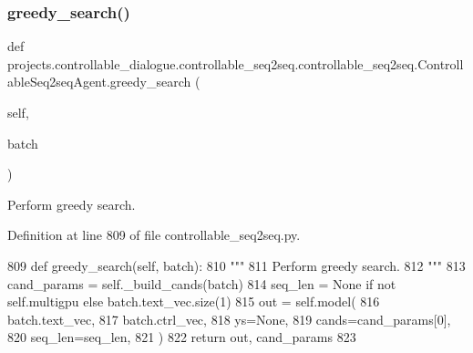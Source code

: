 \subsubsection{\texorpdfstring{greedy\+\_\+search()}{greedy\_search()}}
{\footnotesize\ttfamily def projects.\+controllable\+\_\+dialogue.\+controllable\+\_\+seq2seq.\+controllable\+\_\+seq2seq.\+Controllable\+Seq2seq\+Agent.\+greedy\+\_\+search (\begin{DoxyParamCaption}\item[{}]{self,  }\item[{}]{batch }\end{DoxyParamCaption})}

\begin{DoxyVerb}Perform greedy search.
\end{DoxyVerb}
 

Definition at line 809 of file controllable\+\_\+seq2seq.\+py.


\begin{DoxyCode}
809     \textcolor{keyword}{def }greedy\_search(self, batch):
810         \textcolor{stringliteral}{"""}
811 \textcolor{stringliteral}{        Perform greedy search.}
812 \textcolor{stringliteral}{        """}
813         cand\_params = self.\_build\_cands(batch)
814         seq\_len = \textcolor{keywordtype}{None} \textcolor{keywordflow}{if} \textcolor{keywordflow}{not} self.multigpu \textcolor{keywordflow}{else} batch.text\_vec.size(1)
815         out = self.model(
816             batch.text\_vec,
817             batch.ctrl\_vec,
818             ys=\textcolor{keywordtype}{None},
819             cands=cand\_params[0],
820             seq\_len=seq\_len,
821         )
822         \textcolor{keywordflow}{return} out, cand\_params
823 
\end{DoxyCode}
\mbox{\label{classprojects_1_1controllable__dialogue_1_1controllable__seq2seq_1_1controllable__seq2seq_1_1ControllableSeq2seqAgent_a938d6646b76eaf838ddcd54ee71aa5d9}} 

